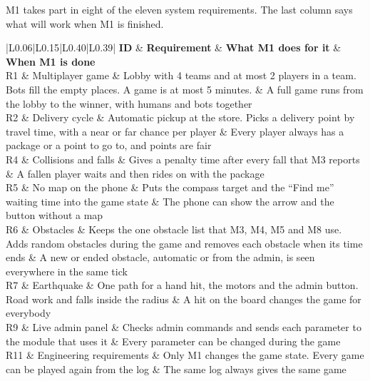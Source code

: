 \documentclass[
  english,
  10pt,
  a4paper,
]{article}
\newcommand{\ckkeep}[1]{\par\noindent\begin{minipage}{\linewidth}\setlength{\parskip}{4pt}#1\end{minipage}\par\smallskip}
\begin{document}
\ckkeep{%
M1 takes part in eight of the eleven system requirements. The last column says what will work when
M1 is finished.

\begin{tabular}{|L{0.06}|L{0.15}|L{0.40}|L{0.39}|}
\hline \textbf{ID} & \textbf{Requirement} & \textbf{What M1 does for it} & \textbf{When M1 is done} \\ \hline 
R1 & Multiplayer game & Lobby with 4 teams and at most 2 players in a team. Bots fill the empty places. A game is at most 5 minutes. & A full game runs from the lobby to the winner, with humans and bots together \\ \hline
R2 & Delivery cycle & Automatic pickup at the store. Picks a delivery point by travel time, with a near or far chance per player & Every player always has a package or a point to go to, and points are fair \\ \hline
R4 & Collisions and falls & Gives a penalty time after every fall that M3 reports & A fallen player waits and then rides on with the package \\ \hline
R5 & No map on the phone & Puts the compass target and the ``Find me'' waiting time into the game state & The phone can show the arrow and the button without a map \\ \hline
R6 & Obstacles & Keeps the one obstacle list that M3, M4, M5 and M8 use. Adds random obstacles during the game and removes each obstacle when its time ends & A new or ended obstacle, automatic or from the admin, is seen everywhere in the same tick \\ \hline
R7 & Earthquake & One path for a hand hit, the motors and the admin button. Road work and falls inside the radius & A hit on the board changes the game for everybody \\ \hline
R9 & Live admin panel & Checks admin commands and sends each parameter to the module that uses it & Every parameter can be changed during the game \\ \hline
R11 & Engineering requirements & Only M1 changes the game state. Every game can be played again from the log & The same log always gives the same game \\ \hline
\end{tabular}}

\end{document}
